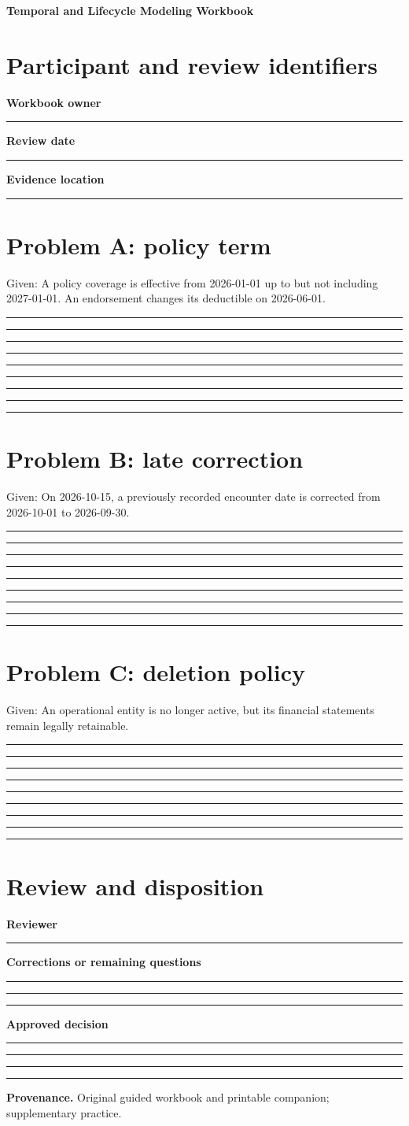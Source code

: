 \documentclass[11pt,letterpaper]{article}
\newcommand{\ResponseLine}{\par\vspace{1.05em}\noindent\rule{\linewidth}{0.4pt}\par}
\newcommand{\ResponseArea}{\ResponseLine\ResponseLine\ResponseLine}
\begin{document}
\begin{center}
{\LARGE\bfseries\color{navy} Temporal and Lifecycle Modeling Workbook}\par
\vspace{0.25em}{\large Printable Blank | response fields left empty}\par
{}
\end{center}
\vspace{0.8em}
\section{Participant and review identifiers}
\textbf{Workbook owner}\ResponseLine\textbf{Review date}\ResponseLine\textbf{Evidence location}\ResponseLine
\section{Problem A: policy term}
Given: A policy coverage is effective from 2026-01-01 up to but not including 2027-01-01. An endorsement changes its deductible on 2026-06-01.


\ResponseArea\ResponseArea\ResponseArea
\section{Problem B: late correction}
Given: On 2026-10-15, a previously recorded encounter date is corrected from 2026-10-01 to 2026-09-30.


\ResponseArea\ResponseArea\ResponseArea
\section{Problem C: deletion policy}
Given: An operational entity is no longer active, but its financial statements remain legally retainable.


\ResponseArea\ResponseArea\ResponseArea
\section{Review and disposition}
\textbf{Reviewer}\ResponseLine\textbf{Corrections or remaining questions}\ResponseArea\textbf{Approved decision}\ResponseArea
\vfill
\hrule
{\footnotesize\textbf{Provenance.} Original guided workbook and printable companion; supplementary practice.}
\end{document}
